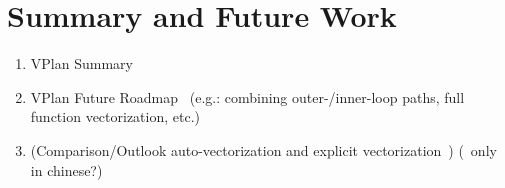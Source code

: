 \documentclass[sigplan,11pt,nonacm]{acmart}
\begin{document}


\section{Summary and Future Work}
\label{sec:summary}
\begin{enumerate}
  \item VPlan Summary~\cite{llvmvplan,llvmvplanupdate}
  \item VPlan Future Roadmap~\cite{llvmvplan,llvmvplanupdate} (e.g.: combining outer-/inner-loop paths, full function vectorization, etc.)
  \item (Comparison/Outlook auto-vectorization and explicit vectorization~\cite{10.1155/2021/3264624, 9802745, DBLP:conf/vldb/BensonER23})
  (\cite{chinese180}~only in chinese?)
\end{enumerate}




\end{document}
